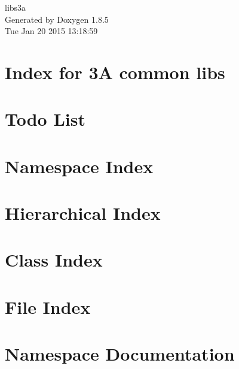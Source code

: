 \documentclass[twoside]{book}
\newcommand{\clearemptydoublepage}{%
  \newpage{\pagestyle{empty}\cleardoublepage}%
}
\begin{document}
\begin{titlepage}
\vspace*{7cm}
\begin{center}%
{\Large libs3a }\\
\vspace*{1cm}
{\large Generated by Doxygen 1.8.5}\\
\vspace*{0.5cm}
{\small Tue Jan 20 2015 13:18:59}\\
\end{center}
\end{titlepage}
\clearemptydoublepage
\tableofcontents
\clearemptydoublepage
{}

\chapter{Index for 3\-A common libs}
\label{index}\hypertarget{index}{}
\chapter{Todo List}
\label{todo}

\chapter{Namespace Index}

\chapter{Hierarchical Index}

\chapter{Class Index}

\chapter{File Index}

\chapter{Namespace Documentation}


























\end{document}
